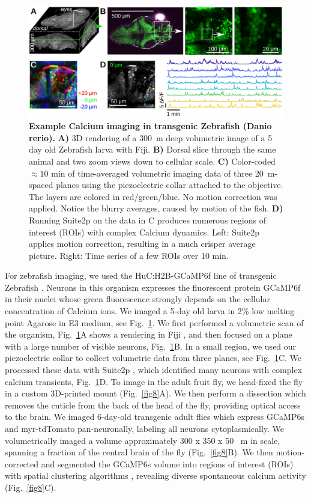 \documentclass[10pt,letterpaper]{article}
\begin{document}
\begin{figure}[t]
    \includegraphics[width=\textwidth]{fig7.jpg}
    \caption{{\bf Example Calcium imaging in transgenic Zebrafish (Danio rerio).} \textbf{A)} 3D rendering of a 300~\textmu m deep volumetric image of a 5 day old Zebrafish larva with Fiji\cite{Schindelin2019}. \textbf{B)} Dorsal slice through the same animal and two zoom views down to cellular scale. \textbf{C)} Color-coded $\approx10\text{ min}$ of time-averaged volumetric imaging data of three 20~\textmu m-spaced planes using the piezoelectric collar attached to the objective. The layers are colored in red/green/blue. No motion correction was applied. Notice the blurry averages, caused by motion of the fish. \textbf{D)} Running Suite2p on the data in C produces numerous regions of interest (ROIs) with complex Calcium dynamics. Left: Suite2p applies motion correction, resulting in a much crisper average picture. Right: Time series of a few ROIs over 10 min.}
    \label{fig7}
\end{figure}
%
%
For zebrafish imaging, we used the HuC:H2B-GCaMP6f line of transgenic Zebrafish \cite{Cong2017}. Neurons in this organism expresses the fluorescent protein GCaMP6f in their nuclei whose green fluorescence strongly depends on the cellular concentration of Calcium ions. We imaged a 5-day old larva in 2\% low melting point Agarose in E3 medium, see Fig.~\ref{fig7}. We first performed a volumetric scan of the organism, Fig.~\ref{fig7}A shows a rendering in Fiji \cite{Schindelin2019}, and then focused on a plane with a large number of visible neurons, Fig.~\ref{fig7}B. In a small region, we used our piezoelectric collar to collect volumetric data from three planes, see Fig.~\ref{fig7}C. We processed these data with Suite2p \cite{Pachitariu2016}, which identified many neurons with complex calcium transients, Fig.~\ref{fig7}D.\newline
To image in the adult fruit fly, we head-fixed the fly in a custom 3D-printed mount \cite{Pacheco2021} (Fig.~\ref{fig8}A). We then perform a dissection which removes the cuticle from the back of the head of the fly, providing optical access to the brain. We imaged 6-day-old transgenic adult flies which express GCaMP6s and myr-tdTomato pan-neuronally, labeling all neurons cytoplasmically. We volumetrically imaged a volume approximately 300 x 350 x 50 ~\textmu m in scale, spanning a fraction of the central brain of the fly (Fig.~\ref{fig8}B). We then motion-corrected and segmented the GCaMP6s volume into regions of interest (ROIs) with spatial clustering algorithms \cite{Pacheco2021}, revealing diverse spontaneous calcium activity (Fig.~\ref{fig8}C). 
\end{document}
